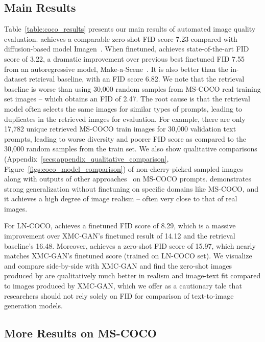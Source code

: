 \subsection{Main Results} \label{secs:main_results}



Table~\ref{table:coco_results} presents our main results of automated image quality evaluation. \bdraw achieves a comparable zero-shot FID score 7.23 compared with diffusion-based model Imagen~\cite{imagen}. When finetuned, \bdraw achieves state-of-the-art FID score of 3.22, a dramatic improvement over previous best finetuned FID 7.55 from an autoregressive model, Make-a-Scene~\cite{gafni2022make}. It is also better than the in-dataset retrieval baseline, with an FID score 6.82. We note that the retrieval baseline is worse than using 30,000 random samples from MS-COCO real training set images -- which obtains an FID of 2.47. The root cause is that the retrieval model often selects the same images for similar types of prompts, leading to duplicates in the retrieved images for evaluation. For example, there are only 17,782 unique retrieved MS-COCO train images for 30,000 validation text prompts, leading to worse diversity and poorer FID score as compared to the 30,000 random samples from the train set. We also show qualitative comparisons (Appendix~\ref{secs:appendix_qualitative_comparison}, Figure~\ref{figs:coco_model_comparison}) of non-cherry-picked \bdraw sampled images along with outputs of other approaches~\cite{ramesh2021zero, nichol2021glide, gafni2022make, ramesh2022hierarchical} on MS-COCO prompts. \bdraw demonstrates strong generalization without finetuning on specific domains like MS-COCO, and it achieves a high degree of image realism -- often very close to that of real images.

For LN-COCO, \bdraw achieves a finetuned FID score of 8.29, which is a massive improvement over XMC-GAN's finetuned result of 14.12 and the retrieval baseline's 16.48. Moreover, \bdraw achieves a zero-shot FID score of 15.97, which nearly matches XMC-GAN's finetuned score (trained on LN-COCO set). We visualize and compare side-by-side with XMC-GAN and find the zero-shot images produced by \bdraw are qualitatively much better in realism and image-text fit compared to images produced by XMC-GAN, which we offer as a cautionary tale that researchers should not rely solely on FID for comparison of text-to-image generation models. 

\subsection{More Results on MS-COCO} \label{secs:more_results}

